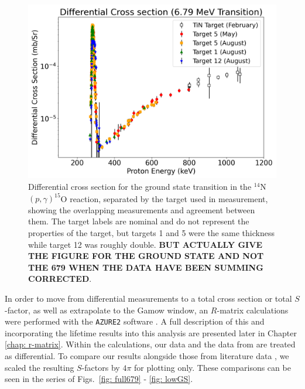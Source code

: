 \begin{figure}
		\includegraphics[width=1.0\linewidth]{figures/cs679_targs.png}
	\caption{Differential cross section for the ground state transition in the $^{14}$N$\left( p,\gamma \right) ^{15}$O reaction, separated by the target used in measurement, showing the overlapping measurements and agreement between them. The target labels are nominal and do not represent the properties of the target, but targets 1 and 5 were the same thickness while target 12 was roughly double. \textbf{BUT ACTUALLY GIVE THE FIGURE FOR THE GROUND STATE AND NOT THE 679 WHEN THE DATA HAVE BEEN SUMMING CORRECTED}.}
	\label{fig: csGS_targs}
\end{figure}




In order to move from differential measurements to a total cross section or total $S$-factor, as well as extrapolate to the Gamow window, an $R$-matrix calculations were performed with the \texttt{AZURE2} software \cite{Azuma2010}. A full description of this and incorporating the lifetime results into this analysis are presented later in Chapter \ref{chap: r-matrix}. Within the calculations, our data and the data from \citet{Li2016} are treated as differential. To compare our results alongside those from literature data \cite{Schroder1987, Imbriani2005, Runkle2005, Li2016, Wagner2018}, we scaled the resulting $S$-factors by $4\pi$ for plotting only.  These comparisons can be seen in the series of Figs.\ \ref{fig: full679} - \ref{fig: lowGS}. 


